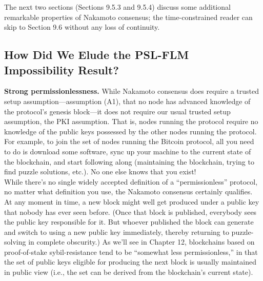 The next two sections (Sections 9.5.3 and 9.5.4) discuss some additional remarkable properties
of Nakamoto consensus; the time-constrained reader can skip to Section 9.6 without any loss
of continuity.
\subsection{How Did We Elude the PSL-FLM Impossibility Result?}
\noindent
\textbf{Strong permissionlessness.} While Nakamoto consensus does require a trusted setup
assumption—assumption (A1), that no node has advanced knowledge of the protocol’s genesis
block—it does not require our usual trusted setup assumption, the PKI assumption. That
is, nodes running the protocol require no knowledge of the public keys possessed by the
other nodes running the protocol. For example, to join the set of nodes running the Bitcoin
protocol, all you need to do is download some software, sync up your machine to the current
state of the blockchain, and start following along (maintaining the blockchain, trying to find
puzzle solutions, etc.). No one else knows that you exist!\\
While there’s no single widely accepted definition of a “permissionless” protocol, no
matter what definition you use, the Nakamoto consensus certainly qualifies. At any moment
in time, a new block might well get produced under a public key that nobody has ever
seen before. (Once that block is published, everybody sees the public key responsible for
it. But whoever published the block can generate and switch to using a new public key
immediately, thereby returning to puzzle-solving in complete obscurity.) As we’ll see in
Chapter 12, blockchains based on proof-of-stake sybil-resistance tend to be “somewhat less
permissionless,” in that the set of public keys eligible for producing the next block is usually
maintained in public view (i.e., the set can be derived from the blockchain’s current state).\\


